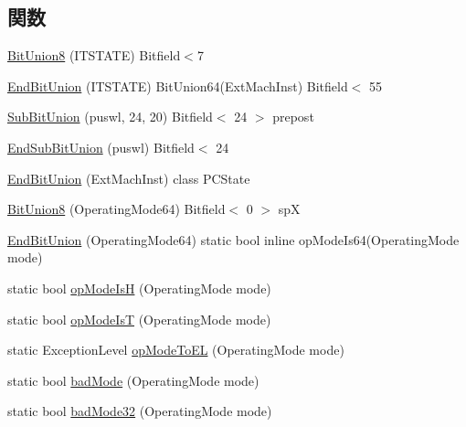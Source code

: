 \subsection*{関数}
\begin{DoxyCompactItemize}
\item 
\hyperlink{namespaceArmISA_a8d22f8d86837d09931b821de285dc6ea}{BitUnion8} (ITSTATE) Bitfield$<$7
\item 
\hyperlink{namespaceArmISA_a8c323a8507eaf411669682e937781017}{EndBitUnion} (ITSTATE) BitUnion64(ExtMachInst) Bitfield$<$ 55
\item 
\hyperlink{namespaceArmISA_a4ab39df15aceedf3ce389901eefb412a}{SubBitUnion} (puswl, 24, 20) Bitfield$<$ 24 $>$ prepost
\item 
\hyperlink{namespaceArmISA_a7f6e4fdae4b138ed14d15d5d0b7252db}{EndSubBitUnion} (puswl) Bitfield$<$ 24
\item 
\hyperlink{namespaceArmISA_a26d1e8dd426431157c92b38071bbc3e9}{EndBitUnion} (ExtMachInst) class PCState
\item 
\hyperlink{namespaceArmISA_a36638228058bc2f783ba5fda95fe9005}{BitUnion8} (OperatingMode64) Bitfield$<$ 0 $>$ spX
\item 
\hyperlink{namespaceArmISA_ab3d1fca016cabbd197ed33355167bc1b}{EndBitUnion} (OperatingMode64) static bool inline opModeIs64(OperatingMode mode)
\item 
static bool \hyperlink{namespaceArmISA_a2c101793cf1c8dba7ec918ffb441ce8f}{opModeIsH} (OperatingMode mode)
\item 
static bool \hyperlink{namespaceArmISA_ac235340b5f554a5f3b60ae1360b6a71f}{opModeIsT} (OperatingMode mode)
\item 
static ExceptionLevel \hyperlink{namespaceArmISA_a39510b1c2b9a3bc190a62447a036237e}{opModeToEL} (OperatingMode mode)
\item 
static bool \hyperlink{namespaceArmISA_ac753a7ae3018771649a66cbd269008fe}{badMode} (OperatingMode mode)
\item 
static bool \hyperlink{namespaceArmISA_a574f1acd8db0b6b71da5aad0865de915}{badMode32} (OperatingMode mode)
\end{DoxyCompactItemize}
